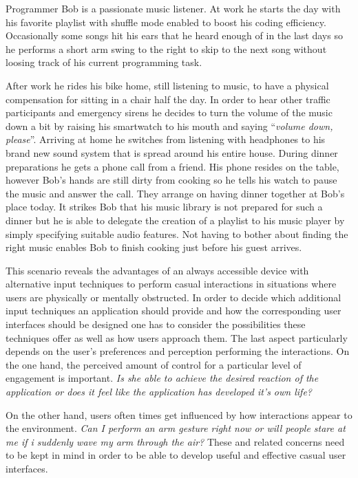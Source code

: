 \begin{addmargin}[1cm]{1cm}
Programmer Bob is a passionate music listener. At work he starts the day with his favorite playlist with shuffle mode enabled to boost his coding efficiency. Occasionally some songs hit his ears that he heard enough of in the last days so he performs a short arm swing to the right to skip to the next song without loosing track of his current programming task. 

After work he rides his bike home, still listening to music, to have a physical compensation for sitting in a chair half the day. In order to hear other traffic participants and emergency sirens he decides to turn the volume of the music down a bit by raising his smartwatch to his mouth and saying ``\textit{volume down, please}''. Arriving at home he switches from listening with headphones to his brand new sound system that is spread around his entire house. During dinner preparations he gets a phone call from a friend. His phone resides on the table, however Bob's hands are still dirty from cooking so he tells his watch to pause the music and answer the call. They arrange on having dinner together at Bob's place today. It strikes Bob that his music library is not prepared for such a dinner but he is able to delegate the creation of a playlist to his music player by simply specifying suitable audio features. Not having to bother about finding the right music enables Bob to finish cooking just before his guest arrives.\\
\end{addmargin}

This scenario reveals the advantages of an always accessible device with alternative input techniques to perform casual interactions in situations where users are physically or mentally obstructed. In order to decide which additional input techniques an application should provide and how the corresponding user interfaces should be designed one has to consider the possibilities these techniques offer as well as how users approach them. The last aspect particularly depends on the user's preferences and perception performing the interactions. On the one hand, the perceived amount of control for a particular level of engagement is important. \textit{Is she able to achieve the desired reaction of the application or does it feel like the application has developed it's own life?}

On the other hand, users often times get influenced by how interactions appear to the environment. \textit{Can I perform an arm gesture right now or will people stare at me if i suddenly wave my arm through the air?}
These and related concerns need to be kept in mind in order to be able to develop useful and effective casual user interfaces.

